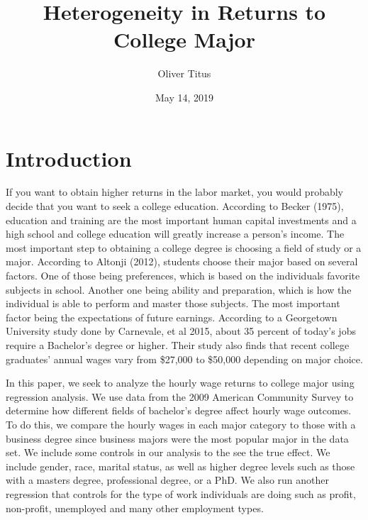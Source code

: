 \documentclass[12pt]{article}
\title{Heterogeneity in Returns to College Major}
\author{Oliver Titus}
\date{May 14, 2019}
\begin{document}
\maketitle

\pagebreak
\section{Introduction}
\par If you want to obtain higher returns in the labor market, you would probably decide that you want to seek a college education. According to Becker (1975), education and training are the most important human capital investments and a high school and college education will greatly increase a person's income. The most important step to obtaining a college degree is choosing a field of study or a major. According to Altonji (2012), students choose their major based on several factors. One of those being preferences, which is based on the individuals favorite subjects in school. Another one being ability and preparation, which is how the individual is able to perform and master those subjects. The most important factor being the expectations of future earnings. According to a Georgetown University study done by Carnevale, et al 2015, about 35 percent of today's jobs require a Bachelor's degree or higher. Their study also finds that recent college graduates' annual wages vary from \$27,000 to \$50,000 depending on major choice.
 
\par In this paper, we seek to analyze the hourly wage returns to college major using regression analysis. We use data from the 2009 American Community Survey to determine how different fields of bachelor's degree affect hourly wage outcomes. To do this, we compare the hourly wages in each major category to those with a business degree since business majors were the most popular major in the data set. We include some controls in our analysis to the see the true effect. We include gender, race, marital status, as well as higher degree levels such as those with a masters degree, professional degree, or a PhD. We also run another regression that controls for the type of work individuals are doing such as profit, non-profit, unemployed and many other employment types.
\end{document}
